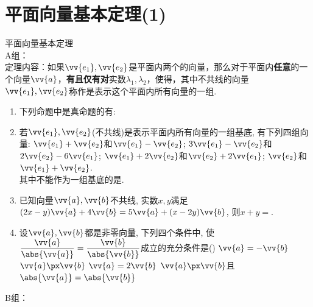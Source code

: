 \section*{平面向量基本定理(1)}
\zsd 平面向量基本定理 \\
A组：\\
定理内容：如果$\vv{e_1}, \vv{e_2}$是平面内两个的向量，那么对于平面内\textbf{任意}的一个向量$\vv{a}$，\textbf{有且仅有对}实数$\lambda_1, \lambda_2$，使得，其中不共线的向量$\vv{e_1}, \vv{e_2}$称作是表示这个平面内所有向量的一组.
\begin{enumerate}
    \item 下列命题中是真命题的有: 
    
    
    \item 若$\vv{e_1},\vv{e_2}$(不共线)是表示平面内所有向量的一组基底, 有下列四组向量: 
     $\vv{e_1}+\vv{e_2}$和$\vv{e_1}-\vv{e_2}$; 
     $3\vv{e_1}-\vv{e_2}$和$2\vv{e_2}-6\vv{e_1}$; 
     $\vv{e_1}+2\vv{e_2}$和$\vv{e_2}+2\vv{e_1}$; 
     $\vv{e_2}$和$\vv{e_1}+\vv{e_2}$. \\
    其中不能作为一组基底的是. 
    
    \item 已知向量$\vv{a},\vv{b}$不共线, 实数$x,y$满足$(2x-y)\vv{a}+4\vv{b}=5\vv{a}+(x-2y)\vv{b}$, 则$x+y=$. 

    \item 设$\vv{a},\vv{b}$都是非零向量, 下列四个条件中, 使$\dfrac{\vv{a}}{\abs{\vv{a}}}=\dfrac{\vv{b}}{\abs{\vv{b}}}$成立的充分条件是\dotfill()
    \xx
    {$\vv{a}=-\vv{b}$}
    {$\vv{a}\px\vv{b}$}
    {$\vv{a}=2\vv{b}$}
    {$\vv{a}\px\vv{b}$且$\abs{\vv{a}}=\abs{\vv{b}}$}
\end{enumerate}
B组：
